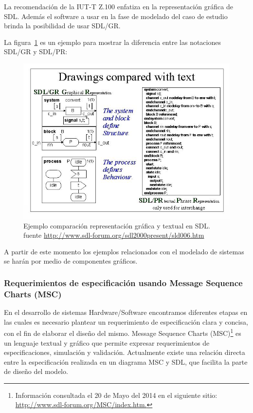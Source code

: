 La recomendaci\'on de la IUT-T Z.100 enfatiza en la representaci\'on gr\'afica 
de SDL. Adem\'as el software a usar en la fase de modelado del caso de estudio 
brinda la posibilidad de usar SDL/GR. 

La figura~\ref{fig:SDLGR_PR} es un ejemplo para mostrar la diferencia entre las notaciones SDL/GR y SDL/PR:

\begin{figure}[H]
  \centering
  \includegraphics[scale=0.6]{./images/EjemploSDLGR_SDLPR.jpg}
  \caption{Ejemplo comparaci\'on representaci\'on gr\'afica y textual en 
SDL. fuente \url{http://www.sdl-forum.org/sdl2000present/sld006.htm}}
  \label{fig:SDLGR_PR}
\end{figure}

A partir de este momento los ejemplos relacionados con el modelado de sistemas 
se har\'an por medio de componentes gr\'aficos.

\subsubsection{Requerimientos de especificaci\'on usando Message Sequence Charts 
(MSC)}

En el desarrollo de sistemas Hardware/Software encontramos diferentes etapas en 
las cuales es necesario plantear un requerimiento de especificaci\'on clara y 
concisa, con el fin de elaborar el dise\~no del mismo. Message Sequence Charts 
(MSC)\footnote{Informaci\'on consultada el 20 de Mayo del 2014 en el siguiente 
sitio: \url{http://www.sdl-forum.org/MSC/index.htm.}} es un lenguaje textual y 
gr\'afico que permite expresar requerimientos de especificaciones, simulaci\'on 
y validaci\'on. Actualmente existe una relaci\'on directa entre la 
especificaci\'on realizada en un diagrama MSC y SDL, que facilita la parte de 
dise\~no del modelo. 

